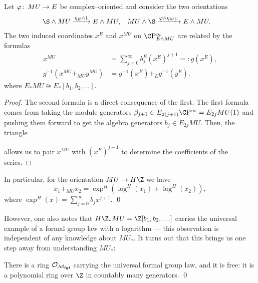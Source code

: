 \begin{lemma}\label{OrientationsOnEAndMU}
Let $\varphi\colon\thinspace MU \to E$ be complex--oriented and consider the two orientations
\begin{align*}
\S \sm MU & \xrightarrow{\eta_E \sm 1} E \sm MU, &
MU \sm \S & \xrightarrow{\phi \sm \eta_{MU}} E \sm MU.
\end{align*}
The two induced coordinates $x^E$ and $x^{MU}$ on $\CP^\infty_{E \sm MU}$ are related by the formulas
\begin{align*}
x^{MU} & = \sum_{j=0}^\infty b_j^E (x^E)^{j+1} =: g(x^E), \\
g^{-1}(x^{MU} +_{MU} y^{MU}) & = g^{-1}(x^E) +_E g^{-1}(y^E).
\end{align*}
where $E_* MU \cong E_*[b_1, b_2, \ldots]$.
\end{lemma}
\begin{proof}
The second formula is a direct consequence of the first.  The first formula comes from taking the module generators $\beta_{j+1} \in E_{2(j+1)} \CP^\infty = E_{2j} MU(1)$ and pushing them forward to get the algebra generators $b_j \in E_{2j} MU$.  Then, the triangle
\begin{center}
\end{center}
allows us to pair $x^{MU}$ with $(x^E)^{j+1}$ to determine the coefficients of the series.
\end{proof}

\begin{corollary}
In particular, for the orientation $MU \to H\Z$ we have \[x_1 +_{MU} x_2 = \exp^H(\log^H(x_1) + \log^H(x_2)),\] where $\exp^H(x) = \sum_{j=0}^\infty b_j x^{j+1}$. \qed
\end{corollary}

However, one also notes that $H\Z_* MU = \Z[b_1, b_2, \ldots]$ carries the universal example of a formal group law with a logarithm --- this observation is independent of any knowledge about $MU_*$.  It turns out that this brings us one step away from understanding $MU_*$:

\begin{theorem}\label{DummyLazardsThm}
There is a ring $\mathcal{O}_{\mathcal{M}_{\mathbf{fgl}}}$ carrying the universal formal group law, and it is free: it is a polynomial ring over $\Z$ in countably many generators. \qed
\end{theorem}

